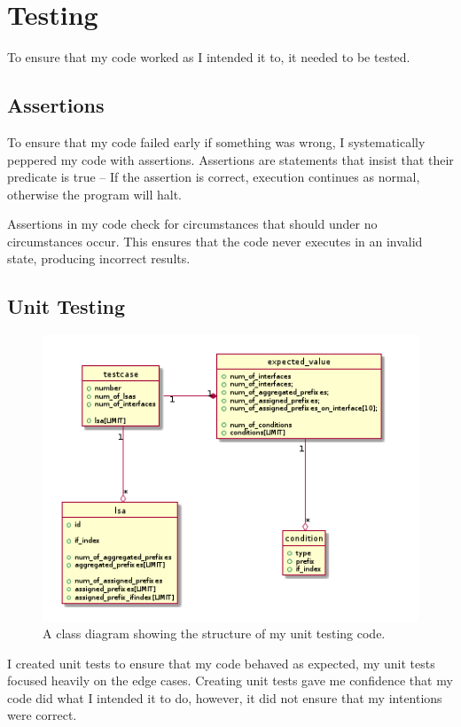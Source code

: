 \documentclass[12pt,a4paper,twoside]{report}
\begin{document}
\chapter{Testing}
To ensure that my code worked as I intended it to, it needed to be tested. 

\section{Assertions}
To ensure that my code failed early if something was wrong, I systematically
peppered my code with assertions. Assertions are statements that insist that
their predicate is true -- If the assertion is correct, execution continues as
normal, otherwise the program will halt.

Assertions in my code check for circumstances that should under no
circumstances occur. This ensures that the code never executes in an invalid
state, producing incorrect results. 

\section{Unit Testing}
\begin{figure}
\begin{center}
	\includegraphics[width=\linewidth]{../Diagrams/Testing/testcase.png}
	\caption{A class diagram showing the structure of my unit testing code.}
	\label{fig:testcase}
\end{center}
\end{figure}
I created unit tests to ensure that my code behaved as expected, my unit tests
focused heavily on the edge cases. Creating unit tests gave me confidence that
my code did what I intended it to do, however, it did not ensure that my
intentions were correct.
\end{document}
